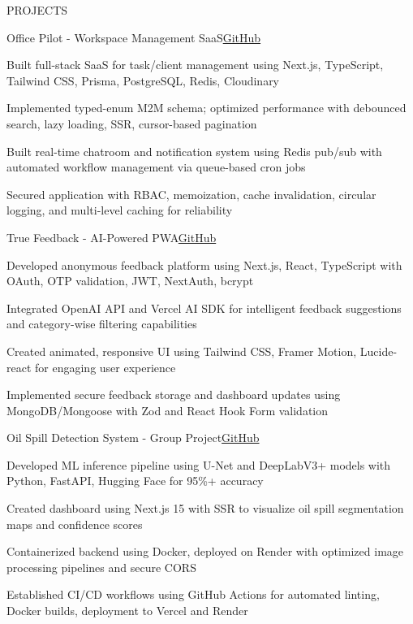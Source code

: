 \documentclass{resume}
\begin{document}
\begin{rSection}{PROJECTS}

\begin{rProject}{Office Pilot - Workspace Management SaaS}{\href{https://github.com/Sahilvishwa2108}{GitHub}}
\item Built full-stack SaaS for task/client management using Next.js, TypeScript, Tailwind CSS, Prisma, PostgreSQL, Redis, Cloudinary
\item Implemented typed-enum M2M schema; optimized performance with debounced search, lazy loading, SSR, cursor-based pagination
\item Built real-time chatroom and notification system using Redis pub/sub with automated workflow management via queue-based cron jobs
\item Secured application with RBAC, memoization, cache invalidation, circular logging, and multi-level caching for reliability
\end{rProject}

\begin{rProject}{True Feedback - AI-Powered PWA}{\href{https://github.com/Sahilvishwa2108}{GitHub}}
\item Developed anonymous feedback platform using Next.js, React, TypeScript with OAuth, OTP validation, JWT, NextAuth, bcrypt
\item Integrated OpenAI API and Vercel AI SDK for intelligent feedback suggestions and category-wise filtering capabilities
\item Created animated, responsive UI using Tailwind CSS, Framer Motion, Lucide-react for engaging user experience
\item Implemented secure feedback storage and dashboard updates using MongoDB/Mongoose with Zod and React Hook Form validation
\end{rProject}

\begin{rProject}{Oil Spill Detection System - Group Project}{\href{https://github.com/Sahilvishwa2108}{GitHub}}
\item Developed ML inference pipeline using U-Net and DeepLabV3+ models with Python, FastAPI, Hugging Face for 95\%+ accuracy
\item Created dashboard using Next.js 15 with SSR to visualize oil spill segmentation maps and confidence scores
\item Containerized backend using Docker, deployed on Render with optimized image processing pipelines and secure CORS
\item Established CI/CD workflows using GitHub Actions for automated linting, Docker builds, deployment to Vercel and Render
\end{rProject}

\end{rSection}
\end{document}
